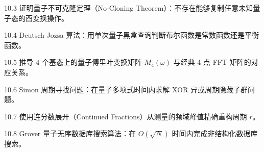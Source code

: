 \begin{exercise}{10.3}
证明量子不可克隆定理（No-Cloning Theorem）：不存在能够复制任意未知量子态的酉变换操作。
\end{exercise}

\begin{exercise}{10.4}
Deutsch-Jozsa 算法：用单次量子黑盒查询判断布尔函数是常数函数还是平衡函数。
\end{exercise}

\begin{exercise}{10.5}
推导 4 个基态上的量子傅里叶变换矩阵 $M_4(\omega)$ 与经典 4 点 FFT 矩阵的对应关系。
\end{exercise}

\begin{exercise}{10.6}
Simon 周期寻找问题：在量子多项式时间内求解 XOR 异或周期隐藏子群问题。
\end{exercise}

\begin{exercise}{10.7}
使用连分数展开（Continued Fractions）从测量的频域峰值精确重构周期 $r$。
\end{exercise}

\begin{exercise}{10.8}
Grover 量子无序数据库搜索算法：在 $O(\sqrt{N})$ 时间内完成非结构化数据库搜索。
\end{exercise}
